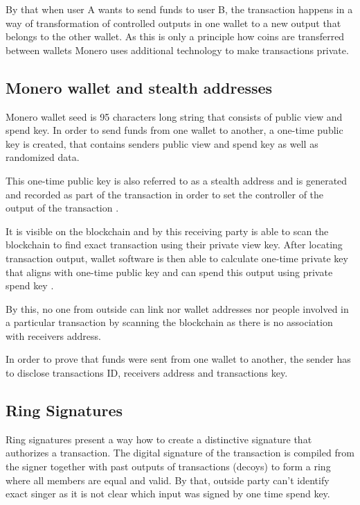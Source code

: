 \documentclass[
  printed, %
  table,   %
  nolof,     %
  nolot,     %
           oneside, color
]{fithesis3}
\begin{document}
By that when user A wants to send funds to user B, the transaction happens in a way of transformation of controlled outputs in one wallet to a new output that belongs to the other wallet. As this is only a principle how coins are transferred between wallets Monero uses additional technology to make transactions private.
\subsection{Monero wallet and stealth addresses}
Monero wallet seed is 95 characters long string that consists of public view and spend key. In order to send funds from one wallet to another, a one-time public key is created, that contains senders public view and spend key as well as randomized data. 

This one-time public key is also referred to as a stealth address and is generated and recorded as part of the transaction in order to set the controller of the output of the transaction \cite{seguias2018monero}.

It is visible on the blockchain and by this receiving party is able to scan the blockchain to find exact transaction using their private view key. After locating transaction output, wallet software is then able to calculate one-time private key that aligns with one-time public key and can spend this output using private spend key \cite{courtois2017stealth}.

By this, no one from outside can link nor wallet addresses nor people involved in a particular transaction by scanning the blockchain as there is no association with receivers address.

In order to prove that funds were sent from one wallet to another, the sender has to disclose transactions ID, receivers address and transactions key.

\subsection{Ring Signatures}

Ring signatures present a way how to create a distinctive signature that authorizes a transaction. The digital signature of the transaction is compiled from the signer together with past outputs of transactions (decoys) to form a ring where all members are equal and valid. By that, outside party can't identify exact singer as it is not clear which input was signed by one time spend key\cite{mercer2016privacy}.
\end{document}
